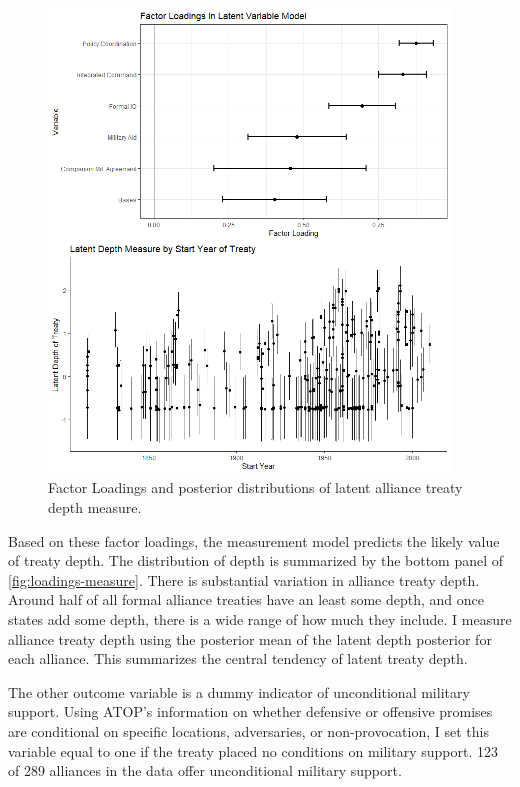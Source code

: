 \documentclass[12pt]{article}
\begin{document}
\begin{figure}[hbtp]
\centering
\includegraphics[width=0.95\textwidth]{../figures/loadings-measure.png}
\caption{Factor Loadings and posterior distributions of latent alliance treaty depth measure.}
\label{fig:loadings-measure}
\end{figure}


Based on these factor loadings, the measurement model predicts the likely value of treaty depth. 
The distribution of depth is summarized by the bottom panel of \autoref{fig:loadings-measure}. 
There is substantial variation in alliance treaty depth. 
Around half of all formal alliance treaties have an least some depth, and once states add some depth, there is a wide range of how much they include.
I measure alliance treaty depth using the posterior mean of the latent depth posterior for each alliance. 
This summarizes the central tendency of latent treaty depth. 


The other outcome variable is a dummy indicator of unconditional military support. 
Using ATOP's information on whether defensive or offensive promises are conditional on specific locations, adversaries, or non-provocation, I set this variable equal to one if the treaty placed no conditions on military support.
123 of 289 alliances in the data offer unconditional military support. 
\end{document}
